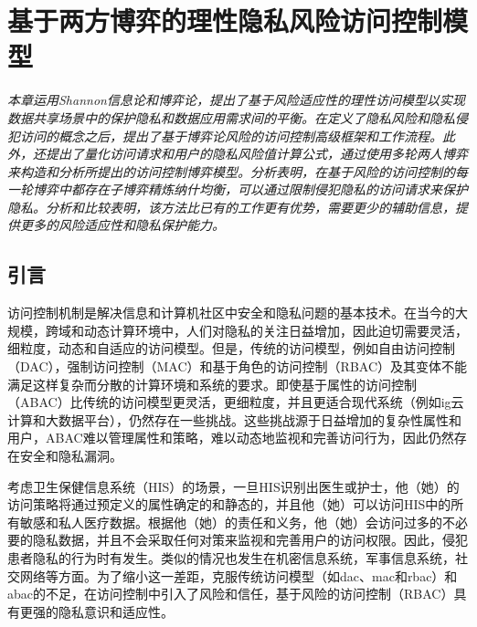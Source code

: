 \chapter{基于两方博弈的理性隐私风险访问控制模型}
\label{chap:game-theoretical-RaBAC-for-privacy}

\textit{本章运用Shannon信息论和博弈论，提出了基于风险适应性的理性访问模型以实现数据共享场景中的保护隐私和数据应用需求间的平衡。在定义了隐私风险和隐私侵犯访问的概念之后，提出了基于博弈论风险的访问控制高级框架和工作流程。此外，还提出了量化访问请求和用户的隐私风险值计算公式，通过使用多轮两人博弈来构造和分析所提出的访问控制博弈模型。分析表明，在基于风险的访问控制的每一轮博弈中都存在子博弈精炼纳什均衡，可以通过限制侵犯隐私的访问请求来保护隐私。分析和比较表明，该方法比已有的工作更有优势，需要更少的辅助信息，提供更多的风险适应性和隐私保护能力。}

\section{引言}

访问控制机制是解决信息和计算机社区中安全和隐私问题的基本技术。在当今的大规模，跨域和动态计算环境中，人们对隐私的关注日益增加，因此迫切需要灵活，细粒度，动态和自适应的访问模型。但是，传统的访问模型，例如自由访问控制（DAC）\cite{lampson1974protection}，强制访问控制（MAC）\cite{bell1973secure}和基于角色的访问控制（RBAC）\cite{sandhu1996role}及其变体不能满足这样复杂而分散的计算环境和系统的要求。即使基于属性的访问控制（ABAC）\cite{kuhn2010}比传统的访问模型更灵活，更细粒度，并且更适合现代系统（例如ig云计算和大数据平台），仍然存在一些挑战\cite{servos2017,paci2018}。这些挑战源于日益增加的复杂性属性和用户，ABAC难以管理属性和策略，难以动态地监视和完善访问行为，因此仍然存在安全和隐私漏洞。

考虑卫生保健信息系统（HIS）的场景，一旦HIS识别出医生或护士，他（她）的访问策略将通过预定义的属性确定的和静态的，并且他（她）可以访问HIS中的所有敏感和私人医疗数据。根据他（她）的责任和义务，他（她）会访问过多的不必要的隐私数据，并且不会采取任何对策来监视和完善用户的访问权限。因此，侵犯患者隐私的行为时有发生。类似的情况也发生在机密信息系统，军事信息系统，社交网络等方面。为了缩小这一差距，克服传统访问模型（如dac、mac和rbac）和abac的不足，在访问控制中引入了风险\cite{cheng2007fuzzy, zhang2018privacy}和信任\cite{dimmock2004, pustchi2015}，基于风险的访问控制（RBAC）\cite{cheng2007fuzzy}具有更强的隐私意识和适应性\cite{ni2010risk, wang2011quantified, zhang2018privacy}。


